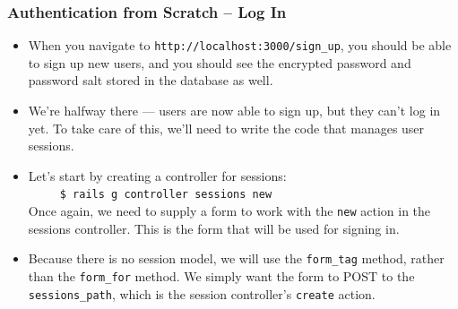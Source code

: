 \documentclass[t,handout]{beamer}
\begin{document}
\begin{frame}\frametitle{Authentication from Scratch -- Log In}
 \begin{itemize}
   \item When you navigate to {\tt http://localhost:3000/sign\_up}, you should be able to sign up new users, and you should see the encrypted password and 
   password salt stored in the database as well.
      \pause
   \item We're halfway there --- users are now able to sign up, but they can't log in yet.  \pause To take care of this, we'll need to write the code that manages user sessions.
   \pause
   \item Let's start by creating a controller for sessions:~\\
   \ \ \ \ \ {\tt\small \$ rails g controller sessions new} ~\\
   \pause
   Once again, we need to supply a form to work with the {\tt new} action in the sessions controller.  
   \pause 
   This is the form that will be used for signing in.
   \pause
   \item Because there is no session model, we will use the {\tt form\_tag} method, rather than the {\tt form\_for} method.  We simply want the form to POST to the {\tt sessions\_path}, which is the session controller's {\tt create} action.
  \end{itemize}
\end{frame} 
\end{document}
